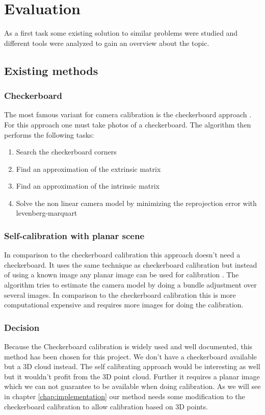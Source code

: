 \documentclass[11pt,a4paper,titlepage,oneside]{report}
\begin{document}
\chapter{Evaluation}

As a first task some existing solution to similar problems were studied and different tools were analyzed to gain an overview about the topic.

\section{Existing methods}
\subsection{Checkerboard}\label{sec:checkerboard}
The most famous variant for camera calibration is the checkerboard approach \cite{Zhang}. For this approach one must take photos of a checkerboard. The algorithm then performs the following tasks:
\begin{enumerate}
  \item Search the checkerboard corners
  \item Find an approximation of the extrinsic matrix
  \item Find an approximation of the intrinsic matrix
  \item Solve the non linear camera model by minimizing the reprojection error with levenberg-marquart
\end{enumerate}

\subsection{Self-calibration with planar scene}
In comparison to the checkerboard calibration this approach doesn't need a checkerboard. It uses the same technique as checkerboard calibration but instead of using a known image any planar image can be used for calibration \cite{selfcalib}. The algorithm tries to estimate the camera model by doing a bundle adjustment over several images. In comparison to the checkerboard calibration this is more computational expensive and requires more images for doing the calibration.

\subsection{Decision}
Because the Checkerboard calibration is widely used and well documented, this method has been chosen for this project. We don't have a checkerboard available but a 3D cloud instead. The self calibrating approach would be interesting as well but it wouldn't profit from the 3D point cloud. Further it requires a planar image which we can not guarantee to be available when doing calibration. As we will see in chapter \ref{chap:implementation} our method needs some modification to the checkerboard calibration to allow calibration based on 3D points.
\end{document}
